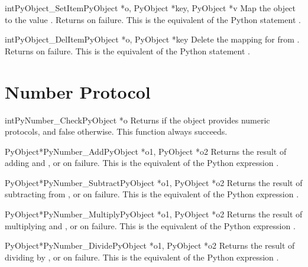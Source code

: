 \documentclass{manual}
\begin{document}
\begin{cfuncdesc}{int}{PyObject_SetItem}{PyObject *o, PyObject *key, PyObject *v}
Map the object  to the value .
Returns  on failure.  This is the equivalent
of the Python statement .
\end{cfuncdesc}


\begin{cfuncdesc}{int}{PyObject_DelItem}{PyObject *o, PyObject *key}
Delete the mapping for  from .  Returns  on
failure. This is the equivalent of the Python statement .
\end{cfuncdesc}


\section{Number Protocol \label{number}}

\begin{cfuncdesc}{int}{PyNumber_Check}{PyObject *o}
Returns  if the object  provides numeric protocols, and
false otherwise. 
This function always succeeds.
\end{cfuncdesc}


\begin{cfuncdesc}{PyObject*}{PyNumber_Add}{PyObject *o1, PyObject *o2}
Returns the result of adding  and , or \NULL{} on
failure.  This is the equivalent of the Python expression
.
\end{cfuncdesc}


\begin{cfuncdesc}{PyObject*}{PyNumber_Subtract}{PyObject *o1, PyObject *o2}
Returns the result of subtracting  from , or \NULL{}
on failure.  This is the equivalent of the Python expression
.
\end{cfuncdesc}


\begin{cfuncdesc}{PyObject*}{PyNumber_Multiply}{PyObject *o1, PyObject *o2}
Returns the result of multiplying  and , or \NULL{} on
failure.  This is the equivalent of the Python expression
.
\end{cfuncdesc}


\begin{cfuncdesc}{PyObject*}{PyNumber_Divide}{PyObject *o1, PyObject *o2}
Returns the result of dividing  by , or \NULL{} on
failure. 
This is the equivalent of the Python expression .
\end{cfuncdesc}
\end{document}

